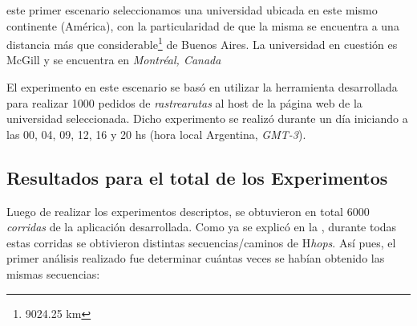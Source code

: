  este primer escenario seleccionamos una universidad ubicada
en este mismo continente (Am\'erica), con la particularidad de que la misma
se encuentra a una distancia m\'as que considerable\footnote{9024.25 km} de
Buenos Aires. La universidad en cuesti\'on es McGill\cite{mcgill} y se encuentra
en \emph{Montr\'eal, Canada}

\par El experimento en este escenario se bas\'o en utilizar la herramienta
desarrollada para realizar 1000 pedidos de \emph{rastrearutas} al host de la
p\'agina web de la universidad seleccionada. Dicho experimento se realiz\'o
durante un d\'ia iniciando a las 00, 04, 09, 12, 16 y 20 hs (hora local Argentina,
\textit{GMT-3}).

\subsection{Resultados para el total de los Experimentos}
\par Luego de realizar los experimentos descriptos, se obtuvieron en total
6000 \textit{corridas} de la aplicaci\'on desarrollada. Como ya se explic\'o
en la \textit{}, durante todas estas corridas se
obtivieron distintas secuencias/caminos de H\textit{hops}. As\'i pues,
el primer an\'alisis realizado fue determinar cu\'antas veces se hab\'ian
obtenido las mismas secuencias:

